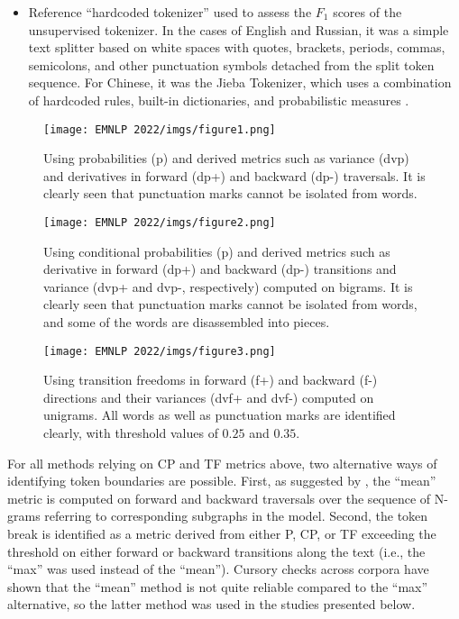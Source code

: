 \documentclass[11pt]{article}
\begin{document}
\begin{itemize}
\item Reference “hardcoded tokenizer” used to assess the $F_1$ scores of the unsupervised tokenizer. In the cases of English and Russian, it was a simple text splitter based on white spaces with quotes, brackets, periods, commas, semicolons, and other punctuation symbols detached from the split token sequence. For Chinese, it was the Jieba Tokenizer, which uses a combination of hardcoded rules, built-in dictionaries, and probabilistic measures \citep{18}. 
\end{itemize}

\begin{figure}
  \texttt{[image: EMNLP 2022/imgs/figure1.png]}
  \caption{Using probabilities (p) and derived metrics such as variance (dvp) and derivatives in forward (dp+) and backward (dp-) traversals. It is clearly seen that punctuation marks cannot be isolated from words.}
\end{figure}

\begin{figure}[!ht]
  \texttt{[image: EMNLP 2022/imgs/figure2.png]}
  \caption{Using conditional probabilities (p) and derived metrics such as derivative in forward (dp+) and backward (dp-) transitions and variance (dvp+ and dvp-, respectively) computed on bigrams. It is clearly seen that punctuation marks cannot be isolated from words, and some of the words are disassembled into pieces.}
\end{figure}

\begin{figure}[!ht]
  \texttt{[image: EMNLP 2022/imgs/figure3.png]}
  \caption{Using transition freedoms in forward (f+) and backward (f-) directions and their variances (dvf+ and dvf-) computed on unigrams. All words as well as punctuation marks are identified clearly, with threshold values of $0.25$ and $0.35$.}
\end{figure}

For all methods relying on CP and TF metrics above, two alternative ways of identifying token boundaries are possible. First, as suggested by \citet{12}, the “mean” metric is computed on forward and backward traversals over the sequence of N-grams referring to corresponding subgraphs in the model. Second, the token break is identified as a metric derived from either P, CP, or TF exceeding the threshold on either forward or backward transitions along the text (i.e.,  the “max” was used instead of the “mean”). Cursory checks across corpora have shown that the “mean” method is not quite reliable compared to the “max” alternative, so the latter method was used in the studies presented below.
\end{document}
